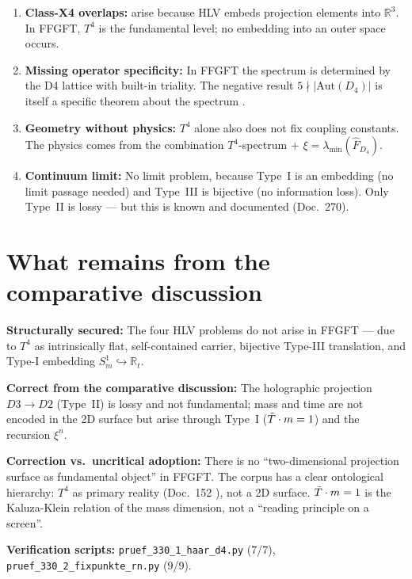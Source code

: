 \begin{enumerate}
  \item \textbf{Class-X4 overlaps:} arise because HLV embeds projection
    elements into $\mathbb{R}^3$. In FFGFT, $T^4$ is the fundamental
    level; no embedding into an outer space occurs.
  \item \textbf{Missing operator specificity:} In FFGFT the spectrum
    is determined by the D4 lattice with built-in triality.
    The negative result $5\nmid|\text{Aut}(D_4)|$ is itself a specific
    theorem about the spectrum \K.
  \item \textbf{Geometry without physics:} $T^4$ alone also does not
    fix coupling constants. The physics comes from the combination
    $T^4$-spectrum $+$ $\xi = \lambda_{\min}(\hat{F}_{D_4})$.
  \item \textbf{Continuum limit:} No limit problem, because Type~I
    is an embedding (no limit passage needed) and Type~III is
    bijective (no information loss). Only Type~II is lossy —
    but this is known and documented (Doc.~270).
\end{enumerate}

\section{What remains from the comparative discussion}
\label{sec:balance}

\textbf{Structurally secured:} The four HLV problems do not arise
in FFGFT — due to $T^4$ as intrinsically flat, self-contained
carrier, bijective Type-III translation, and Type-I embedding
$S^1_m\hookrightarrow\mathbb{R}_t$.

\textbf{Correct from the comparative discussion:}
The holographic projection $D3\to D2$ (Type~II) is lossy and not
fundamental; mass and time are not encoded in the 2D surface but
arise through Type~I ($\tilde{T}\cdot m=1$) and the recursion $\xi^n$.

\textbf{Correction vs.\ uncritical adoption:}
There is no ``two-dimensional projection surface as fundamental
object'' in FFGFT. The corpus has a clear ontological hierarchy:
$T^4$ as primary reality (Doc.~152 \SETZ), not a 2D surface.
$\tilde{T}\cdot m=1$ is the Kaluza-Klein relation of the mass dimension,
not a ``reading principle on a screen''.

\vspace{4pt}\noindent
\textbf{Verification scripts:}
\texttt{pruef\_330\_1\_haar\_d4.py} (7/7),
\texttt{pruef\_330\_2\_fixpunkte\_rn.py} (9/9).

